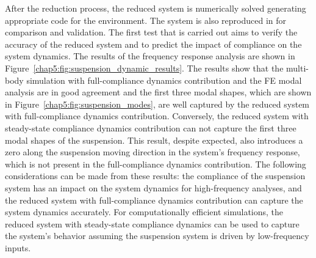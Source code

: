 \begin{table}
{\begin{tabular}{cccc}
  \end{tabular}}
\end{table}

After the reduction process, the reduced system is numerically solved generating appropriate code for the \Simulink{} environment. The system is also reproduced in \Ansys{} for comparison and validation. The first test that is carried out aims to verify the accuracy of the reduced system and to predict the impact of compliance on the system dynamics. The results of the frequency response analysis are shown in Figure~\ref{chap5:fig:suspension_dynamic_results}. The results show that the \Simulink{} multi-body simulation with full-compliance dynamics contribution and the \Ansys{} \ac{FE} modal analysis are in good agreement and the first three modal shapes, which are shown in Figure~\ref{chap5:fig:suspension_modes}, are well captured by the reduced system with full-compliance dynamics contribution. Conversely, the reduced system with steady-state compliance dynamics contribution can not capture the first three modal shapes of the suspension. This result, despite expected, also introduces a zero along the suspension moving direction in the system's frequency response, which is not present in the full-compliance dynamics contribution. The following considerations can be made from these results: the compliance of the suspension system has an impact on the system dynamics for high-frequency analyses, and the reduced system with full-compliance dynamics contribution can capture the system dynamics accurately. For computationally efficient simulations, the reduced system with steady-state compliance dynamics can be used to capture the system's behavior assuming the suspension system is driven by low-frequency inputs.

